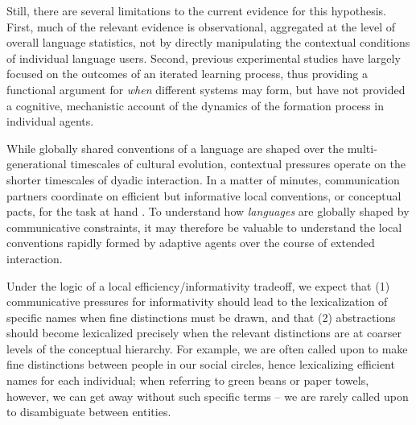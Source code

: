 \documentclass[10pt,letterpaper]{article}
\begin{document}
Still, there are several limitations to the current evidence for this hypothesis. 
First, much of the relevant evidence is observational, aggregated at the level of overall language statistics, not by directly manipulating the contextual conditions of individual language users. 
Second, previous experimental studies have largely focused on the outcomes of an iterated learning process, thus providing a functional argument for \emph{when} different systems may form, but have not provided a cognitive, mechanistic account of the dynamics of the formation process in individual agents.

While globally shared conventions of a language are shaped over the multi-generational timescales of cultural evolution, contextual pressures operate on the shorter timescales of dyadic interaction. 
In a matter of minutes, communication partners coordinate on efficient but informative local conventions, or conceptual pacts, for the task at hand \cite{ClarkWilkesGibbs86_ReferringCollaborative, BrennanClark96_ConceptualPactsConversation,HawkinsFrankGoodman17_ConventionFormation}. 
To understand how \emph{languages} are globally shaped by communicative constraints, it may therefore be valuable to understand the local conventions rapidly formed by adaptive agents over the course of extended interaction.

Under the logic of a local efficiency/informativity tradeoff, we expect that 
(1) communicative pressures for informativity should lead to the lexicalization of specific names when fine distinctions must be drawn, and that 
(2) abstractions should become lexicalized precisely when the relevant distinctions are at coarser levels of the conceptual hierarchy. 
For example, we are often called upon to make fine distinctions between people in our social circles, hence lexicalizing efficient names for each individual; when referring to green beans or paper towels, however, we can get away without such specific terms -- we are rarely called upon to disambiguate between entities. %
\end{document}
